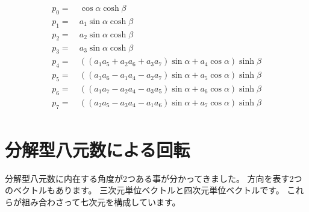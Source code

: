 \documentclass[a4paper,12pt,notitlepage]{jsreport}
\begin{document}
\begin{equation}
  \begin{split}
    p_0=~&\cos\alpha\cosh\beta\\
    p_1=~&a_1\sin\alpha\cosh\beta\\
    p_2=~&a_2\sin\alpha\cosh\beta\\
    p_3=~&a_3\sin\alpha\cosh\beta\\
    p_4=~&((a_1a_5+a_2a_6+a_3a_7)\sin\alpha+a_4\cos\alpha)\sinh\beta\\
    p_5=~&((a_3a_6-a_1a_4-a_2a_7)\sin\alpha+a_5\cos\alpha)\sinh\beta\\
    p_6=~&((a_1a_7-a_2a_4-a_3a_5)\sin\alpha+a_6\cos\alpha)\sinh\beta\\
    p_7=~&((a_2a_5-a_3a_4-a_1a_6)\sin\alpha+a_7\cos\alpha)\sinh\beta\\
  \end{split}
\end{equation}

\section{分解型八元数による回転}

分解型八元数に内在する角度が2つある事が分かってきました。
方向を表す2つのベクトルもあります。
三次元単位ベクトルと四次元単位ベクトルです。
これらが組み合わさって七次元を構成しています。
\end{document}
